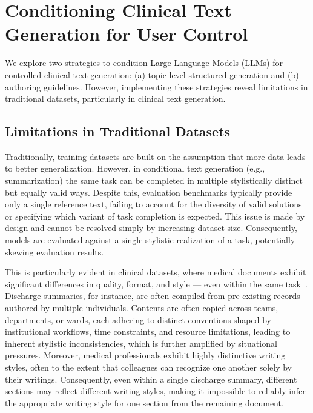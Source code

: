 \section{Conditioning Clinical Text Generation for User Control}
We explore two strategies to condition Large Language Models (LLMs) for controlled clinical text generation: (a) topic-level structured generation and (b) authoring guidelines. However, implementing these strategies reveal limitations in traditional datasets, particularly in clinical text generation.

\subsection{Limitations in Traditional Datasets}
\label{sec:limitations-in-traditional-datasets}
Traditionally, training datasets are built on the assumption that more data leads to better generalization. However, in conditional text generation (e.g., summarization) the same task can be completed in multiple stylistically distinct but equally valid ways. Despite this, evaluation benchmarks typically provide only a single reference text, failing to account for the diversity of valid solutions or specifying which variant of task completion is expected. This issue is made by design and cannot be resolved simply by increasing dataset size. Consequently, models are evaluated against a single stylistic realization of a task, potentially skewing evaluation results.

This is particularly evident in clinical datasets, where medical documents exhibit significant differences in quality, format, and style --- even within the same task~\citep{POLLARD201339,edwards2014association,Hultman2019ChallengesAO}. Discharge summaries, for instance, are often compiled from pre-existing records authored by multiple individuals. Contents are often copied across teams, departments, or wards, each adhering to distinct conventions shaped by institutional workflows, time constraints, and resource limitations, leading to inherent stylistic inconsistencies, which is further amplified by situational pressures. Moreover, medical professionals exhibit highly distinctive writing styles, often to the extent that colleagues can recognize one another solely by their writings. Consequently, even within a single discharge summary, different sections may reflect different writing styles, making it impossible to reliably infer the appropriate writing style for one section from the remaining document.

